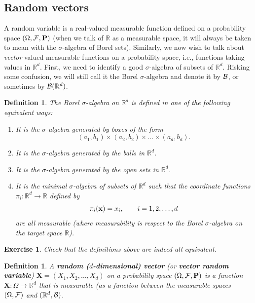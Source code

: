 \documentclass[12pt]{article}
\newtheorem{defi}[thm]{Definition}
\newtheorem{exercise}[thm]{Exercise}
\newcommand{\R}{\mathbb{R}}
\newcommand{\prob}{\mathbf{P}}
\theoremstyle{example}
\begin{document}


\subsection{Random vectors}

A random variable is a real-valued measurable function defined on a probability space $(\Omega, {\cal F}, \prob)$ (when we talk of $\R$ as a measurable space, it will always be taken to mean with the $\sigma$-algebra of Borel sets). Similarly, we now wish to talk about \emph{vector}-valued measurable functions on a probability space, i.e., functions taking values in $\R^d$. First, we need to identify a good $\sigma$-algebra of subsets of $\R^d$. Risking some confusion, we will still call it the Borel $\sigma$-algebra and denote it by ${\cal B}$, or sometimes by ${\cal B}(\R^d)$.

\begin{defi} 
\label{defi-borelrd}
The Borel $\sigma$-algebra on $\R^d$ is defined in one of the following equivalent ways:
\renewcommand{\labelenumi}{(\roman{enumi})}
\begin{enumerate}
\item It is the $\sigma$-algebra generated by boxes of the form
$$ (a_1,b_1) \times (a_2,b_2) \times \ldots \times (a_d,b_d). $$
\item It is the $\sigma$-algebra generated by the balls in $\R^d$.
\item It is the $\sigma$-algebra generated by the open sets in $\R^d$.
\item It is the minimal $\sigma$-algebra of subsets of $\R^d$ such that the coordinate functions $\pi_i:\R^d\to\R$ defined by $$\pi_i({\bf x}) = x_i, \qquad i=1,2,\ldots,d$$
are all measurable (where measurability is respect to the Borel $\sigma$-algebra on the target space $\R$).
\end{enumerate}
\end{defi}

\begin{exercise} Check that the definitions above are indeed all equivalent.
\end{exercise}

\begin{defi} A \textbf{random ($d$-dimensional) vector} (or \textbf{vector random variable}) $\mathbf{X}=(X_1,X_2,\ldots,X_d)$ on a probability space $(\Omega, {\cal F}, \prob)$ is a function $\mathbf{X}:\Omega\to\R^d$ that is measurable (as a function between the measurable spaces $(\Omega, {\cal F})$ and $(\R^d, {\cal B})$.
\end{defi}
\end{document}
